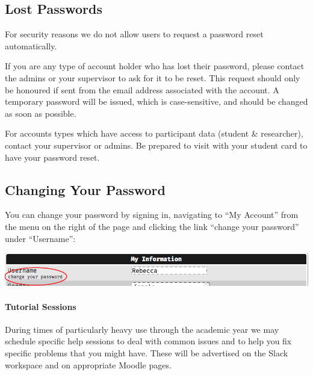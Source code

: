 \documentclass[]{book}
\let\oldparagraph\paragraph
\renewcommand{\paragraph}[1]{\oldparagraph{#1}\mbox{}}
\begin{document}
\hypertarget{lost-passwords}{%
\subsection*{Lost Passwords}\label{lost-passwords}}

For security reasons we do not allow users to request a password reset automatically.

If you are any type of account holder who has lost their password, please contact the admins or your supervisor to ask for it to be reset. This request should only be honoured if sent from the email address associated with the account. A temporary password will be issued, which is case-sensitive, and should be changed as soon as possible.

For accounts types which have access to participant data (student \& researcher), contact your supervisor or admins. Be prepared to visit with your student card to have your password reset.

\hypertarget{changing-your-password}{%
\subsection*{Changing Your Password}\label{changing-your-password}}

You can change your password by signing in, navigating to ``My Account'' from the menu on the right of the page and clicking the link ``change your password'' under ``Username'':

\includegraphics{images/screenshots/change_password.png}

\hypertarget{tutorial-sessions}{%
\paragraph{Tutorial Sessions}\label{tutorial-sessions}}

During times of particularly heavy use through the academic year we may schedule specific help sessions to deal with common issues and to help you fix specific problems that you might have. These will be advertised on the Slack workspace and on appropriate Moodle pages.
\end{document}
